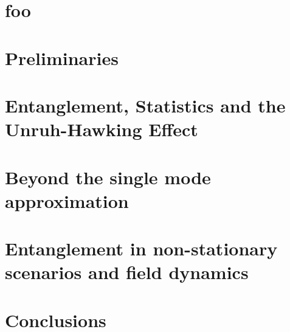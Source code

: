 \documentclass[12pt,a4paper,twoside,nofootinbib,british]{book}
\numberwithin{equation}{section}
\begin{document}
\thispagestyle{empty}







%

\setcounter{page}{1}
\thispagestyle{empty}
\tableofcontents

\newpage

%

\part*{foo}




\part*{Preliminaries}




\part[Entanglement, statistics and the Unruh-Hawking effect]{Entanglement, Statistics and the Unruh-Hawking Effect}
\label{part1}











\part[Beyond the single mode approximation]{Beyond the single mode approximation}
\label{part2}










\part[Non-stationary spacetimes and field dynamics]{Entanglement in non-stationary scenarios and field dynamics}
\label{part3}







\part*{Conclusions}



\appendix






\end{document}
